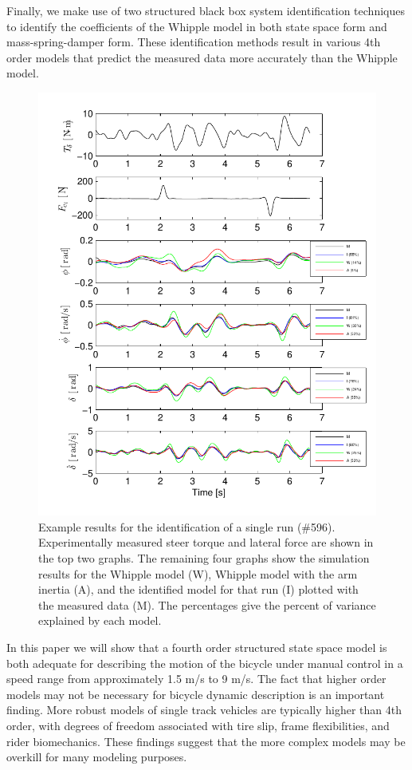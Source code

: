 \documentclass{article}
\begin{document}
Finally, we make use of two structured black box system identification
techniques to identify the coefficients of the Whipple model in both state
space form and mass-spring-damper form. These identification methods result in
various 4th order models that predict the measured data more accurately than
the Whipple model.

\begin{figure}
  \centering
  \includegraphics[width=5.0in]{example-fit.pdf}
  \caption{Example results for the identification of a single run (\#596).
    Experimentally measured steer torque and lateral force are shown in the top
    two graphs. The remaining four graphs show the simulation results for the
    Whipple model (W), Whipple model with the arm inertia (A), and the
    identified model for that run (I) plotted with the measured data (M). The
  percentages give the percent of variance explained by each model.}
\end{figure}

In this paper we will show that a fourth order structured state space model is
both adequate for describing the motion of the bicycle under manual control in
a speed range from approximately 1.5 m/s to 9 m/s. The fact that higher order
models may not be necessary for bicycle dynamic description is an important
finding. More robust models of single track vehicles are typically higher than
4th order, with degrees of freedom associated with tire slip, frame
flexibilities, and rider biomechanics. These findings suggest that the more
complex models may be overkill for many modeling purposes.
\end{document}
